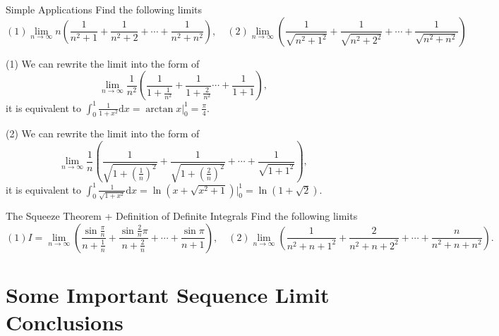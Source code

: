 \begin{example}{Simple Applications}{}
  Find the following limits
  \begin{equation}
    (1) \lim \limits _{n \rightarrow \infty} n \left( \frac{1}{n^2 + 1} + \frac{1}{n^2 + 2} + \cdots + \frac{1}{n^2 + n^2} \right), \quad
    (2) \lim \limits _{n \rightarrow \infty}  \left( \frac{1}{\sqrt{n^2 + 1^2}} + \frac{1}{\sqrt{n^2 + 2^2}} + \cdots + \frac{1}{\sqrt{n^2 + n^2}} \right)
  \end{equation}
\end{example}

\begin{solution}
  (1) We can rewrite the limit into the form of
  \begin{equation}
    \lim \limits _{n \rightarrow \infty} \frac{1}{n^2} \left( \frac{1}{1 + \frac{1}{n^2}} + \frac{1}{1 + \frac{2}{n^2}} \cdots + \frac{1}{1 + 1} \right),
  \end{equation}
  it is equivalent to $\int_0^1 \frac{1}{1 + x^2} \mathrm{d} x = \arctan x
  \big|^1_0 = \frac{\pi}{4}$.

  (2) We can rewrite the limit into the form of
  \begin{equation}
    \lim \limits _{n \rightarrow \infty} \frac{1}{n} \left( \frac{1}{\sqrt{1 + (\frac{1}{n})^2}} + \frac{1}{\sqrt{1 + (\frac{2}{n})^2}} + \cdots + \frac{1}{\sqrt{1 + 1^2}} \right),
  \end{equation}
  it is equivalent to $\int_0^1 \frac{1}{\sqrt{1 + x^2}}\mathrm{d} x = \ln (x +
  \sqrt{x^2 + 1}) \big|^1_0 = \ln (1 + \sqrt{2})$.
\end{solution}

\begin{example}{The Squeeze Theorem + Definition of Definite Integrals}{}
  Find the following limits
  \begin{equation}
    (1) I = \lim \limits _{n \rightarrow \infty} \left( \frac{\sin \frac{\pi}{n}}{n + \frac{1}{n}} + \frac{\sin \frac{2}{n}\pi}{n + \frac{2}{n}} + \cdots + \frac{\sin \pi}{n + 1} \right), \quad
    (2) \lim \limits _{n \rightarrow \infty} \left( \frac{1}{n^2 + n + 1^2} + \frac{2}{n^2 + n + 2^2} + \cdots + \frac{n}{n^2 + n + n^2}\right).
  \end{equation}
\end{example}

\begin{solution}
  
\end{solution}

\section{Some Important Sequence Limit Conclusions}

